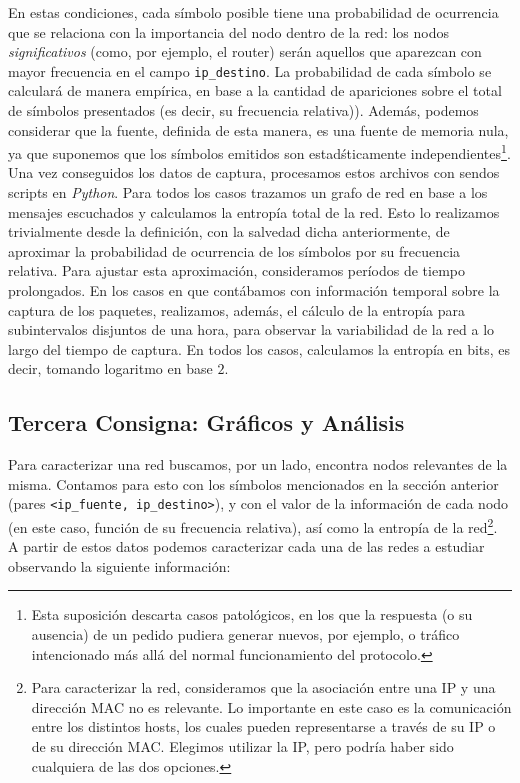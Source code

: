 En estas condiciones, cada s\'imbolo posible tiene una probabilidad de ocurrencia que se relaciona con la importancia del nodo dentro de la red: los nodos \emph{significativos} (como, por ejemplo, el router) ser\'an aquellos que aparezcan con mayor frecuencia en el campo \texttt{ip\_destino}. La probabilidad de cada s\'imbolo se calcular\'a de manera emp\'irica, en base a la cantidad de apariciones sobre el total de s\'imbolos presentados (es decir, su frecuencia relativa)). Además, podemos considerar que la fuente, definida de esta manera, es una fuente de memoria nula, ya que suponemos que los s\'imbolos emitidos son estad\'sticamente independientes\footnote{Esta suposición descarta casos patológicos, en los que la respuesta (o su ausencia) de un pedido pudiera generar nuevos, por ejemplo, o tráfico intencionado más allá del normal funcionamiento del protocolo.}.\\

Una vez conseguidos los datos de captura, procesamos estos archivos con sendos scripts en \emph{Python}. Para todos los casos trazamos un grafo de red en base a los mensajes escuchados y calculamos la entropía total de la red. Esto lo realizamos trivialmente desde la definición, con la salvedad dicha anteriormente, de aproximar la probabilidad de ocurrencia de los símbolos por su frecuencia relativa. Para ajustar esta aproximación, consideramos períodos de tiempo prolongados. En los casos en que contábamos con información temporal sobre la captura de los paquetes, realizamos, además, el cálculo de la entropía para subintervalos disjuntos de una hora, para observar la variabilidad de la red a lo largo del tiempo de captura. En todos los casos, calculamos la entropía en bits, es decir, tomando logaritmo en base $2$.

\subsection{Tercera Consigna: Gr\'aficos y An\'alisis}

Para caracterizar una red buscamos, por un lado, encontra nodos relevantes de la misma. Contamos para esto con los s\'imbolos mencionados en la secci\'on anterior (pares \texttt{<ip\_fuente, ip\_destino>}), y con el valor de la informaci\'on de cada nodo (en este caso, función de su frecuencia relativa), así como la entrop\'ia de la red\footnote{Para caracterizar la red, consideramos que la asociaci\'on entre una IP y una direcci\'on MAC no es relevante. Lo importante en este caso es la comunicaci\'on entre los distintos hosts, los cuales pueden representarse a trav\'es de su IP o de su direcci\'on MAC. Elegimos utilizar la IP, pero podr\'ia haber sido cualquiera de las dos opciones.}. A partir de estos datos podemos caracterizar cada una de las redes a estudiar observando la siguiente informaci\'on:

